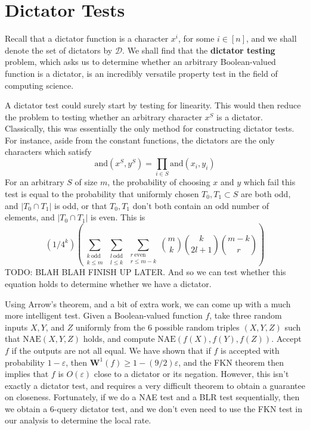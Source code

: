 \section{Dictator Tests}

Recall that a dictator function is a character $x^i$, for some $i \in [n]$, and we shall denote the set of dictators by $\mathcal{D}$. We shall find that the {\bf dictator testing} problem, which asks us to determine whether an arbitrary Boolean-valued function is a dictator, is an incredibly versatile property test in the field of computing science.

A dictator test could surely start by testing for linearity. This would then reduce the problem to testing whether an arbitrary character $x^S$ is a dictator. Classically, this was essentially the only method for constructing dictator tests. For instance, aside from the constant functions, the dictators are the only characters which satisfy
%
\[ \text{and}(x^S, y^S) = \prod_{i \in S} \text{and}(x_i,y_i) \]
%
For an arbitrary $S$ of size $m$, the probability of choosing $x$ and $y$ which fail this test is equal to the probability that uniformly chosen $T_0,T_1 \subset S$ are both odd, and $|T_0 \cap T_1|$ is odd, or that $T_0,T_1$ don't both contain an odd number of elements, and $|T_0 \cap T_1|$ is even. This is
%
\[ (1/4^k)\left( \sum_{\substack{k\ \text{odd}\\ k \leq m}} \sum_{\substack{l\ \text{odd}\\l \leq k}} \sum_{\substack{r\ \text{even}\\r \leq m - k}} {m \choose k} {k \choose 2l + 1} {m - k \choose r} \right) \]
%
TODO: BLAH BLAH FINISH UP LATER. And so we can test whether this equation holds to determine whether we have a dictator.

Using Arrow's theorem, and a bit of extra work, we can come up with a much more intelligent test. Given a Boolean-valued function $f$, take three random inputs $X,Y$, and $Z$ uniformly from the 6 possible random triples $(X,Y,Z)$ such that $\text{NAE}(X,Y,Z)$ holds, and compute $\text{NAE}(f(X),f(Y),f(Z))$. Accept $f$ if the outputs are not all equal. We have shown that if $f$ is accepted with probability $1 - \varepsilon$, then $\mathbf{W}^1(f) \geq 1 - (9/2) \varepsilon$, and the FKN theorem then implies that $f$ is $O(\varepsilon)$ close to a dictator or its negation. However, this isn't exactly a dictator test, and requires a very difficult theorem to obtain a guarantee on closeness. Fortunately, if we do a NAE test and a BLR test sequentially, then we obtain a 6-query dictator test, and we don't even need to use the FKN test in our analysis to determine the local rate.

